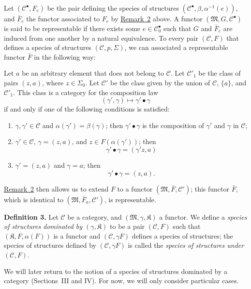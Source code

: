 \documentclass[a4paper,oneside,nobib,nofonts,notitlepage,notoc,nols,fleqn,justified]{tufte-book}
\newenvironment{rmenv}[1]
  {\phantomsection\par\medskip\noindent\textbf{#1.}\rmfamily}
  {\par\medskip}
\newcommand{\oldpage}[1]{{\reversemarginpar\marginnote{\raggedleft\footnotesize\textit{p.~#1}}}}
\newcommand{\CC}{\mathcal{C}}
\newcommand{\MM}{\mathfrak{M}}
\newcommand{\KK}{\mathfrak{K}}
\begin{document}
\oldpage{354}
Let $(\CC^\bullet,F_e)$ be the pair defining the species of structures $(\CC^\bullet,\beta,\alpha^{-1}(e))$, and $\bar{F}_e$ the functor associated to $F_e$ by \hyperref[remark:i-2]{Remark~2} above.
A functor $(\MM,G,\CC^\bullet)$ is said to be representable \cite{2} if there exists some $e\in\CC_0^\bullet$ such that $G$ and $\bar{F}_e$ are induced from one another by a natural equivalence.
To every pair $(\CC,F)$ that defines a species of structures $(\CC,p,\Sigma)$, we can associated a representable functor $\bar{F}$ in the following way:

Let $a$ be an arbitrary element that does not belong to $\CC$.
Let $\CC'_1$ be the class of pairs $(z,a)$, where $z\in\Sigma_0$.
Let $\CC'$ be the class given by the union of $\CC$, $\{a\}$, and $\CC'_1$.
This class is a category for the composition law
\[
  (\gamma',\gamma)
  \longmapsto\gamma'\bullet\gamma
\]
if and only if one of the following conditions is satisfied:
\begin{enumerate}
  \item[\normalfont(1)]
    $\gamma,\gamma'\in\CC$ and $\alpha(\gamma')=\beta(\gamma)$;
    then $\gamma'\bullet\gamma$ is the composition of $\gamma'$ and $\gamma$ in $\CC$;
  \item[\normalfont(2)]
    $\gamma'\in\CC$, $\gamma=(z,a)$, and $z\in F(\alpha(\gamma'))$;
    then
    \[
      \gamma'\bullet\gamma
      =(\gamma'z,a)
    \]
  \item[\normalfont(3)]
    $\gamma'=(z,a)$ and $\gamma=a$;
    then
    \[
      \gamma'\bullet\gamma
      =(z,a).
    \]
\end{enumerate}
\hyperref[remark:i-2]{Remark~2} then allows us to extend $F$ to a functor $(\MM,\bar{F},\CC')$;
this functor $\bar{F}$, which is identical to $(\MM,\bar{F}_a,\CC')$, is representable.

\begin{rmenv}{Definition 3}
\label{definition:i-3}
  Let $\CC$ be a category, and $(\MM,\gamma,\KK)$ a functor.
  We define a \emph{species of structures dominated by $(\gamma,\KK)$} to be a pair $(\CC,F)$ such that $(\KK,F,\alpha(F))$ is a functor and $(\CC,\gamma F)$ defines a species of structures;
  the species of structures defined by $(\CC,\gamma F)$ is called the \emph{species of structures under $(\CC,F)$}.
\end{rmenv}

We will later return to the notion of a species of structures dominated by a category (Sections~III and IV).
For now, we will only consider particular cases.
\end{document}
